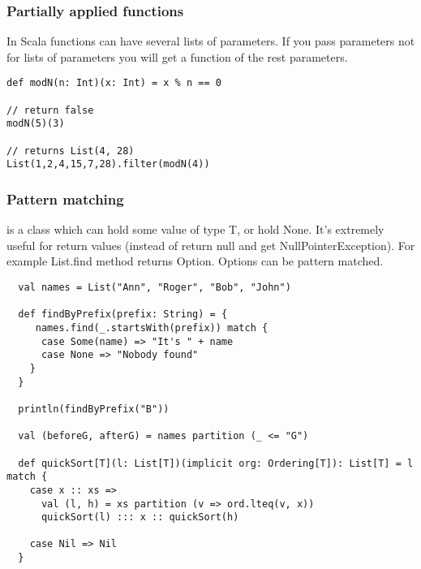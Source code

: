 \begin{frame}[fragile]
\frametitle{Partially applied functions}

In Scala functions can have several lists of parameters. If you pass parameters not for lists of parameters
you will get a function of the rest parameters.

\begin{example}
\begin{lstlisting}
def modN(n: Int)(x: Int) = x % n == 0

// return false
modN(5)(3)

// returns List(4, 28)
List(1,2,4,15,7,28).filter(modN(4))
\end{lstlisting}
\end{example}
\end{frame}

\begin{frame}[fragile]
\frametitle{Pattern matching}

 is a class which can hold some value of type T, or hold None. It's extremely useful for return values
(instead of return null and get NullPointerException). For example List.find method returns Option. Options can be pattern matched.

\begin{lstlisting}
  val names = List("Ann", "Roger", "Bob", "John")

  def findByPrefix(prefix: String) = {
     names.find(_.startsWith(prefix)) match {
      case Some(name) => "It's " + name
      case None => "Nobody found"
    }
  }

  println(findByPrefix("B"))

  val (beforeG, afterG) = names partition (_ <= "G")

  def quickSort[T](l: List[T])(implicit org: Ordering[T]): List[T] = l match {
    case x :: xs => 
      val (l, h) = xs partition (v => ord.lteq(v, x))
      quickSort(l) ::: x :: quickSort(h)

    case Nil => Nil
  }
\end{lstlisting}

\end{frame}

